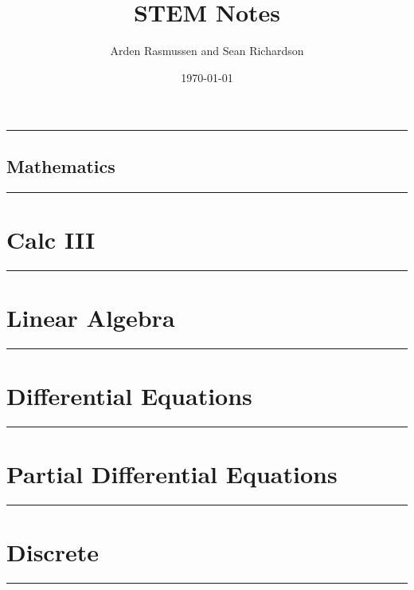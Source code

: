 \documentclass[10pt,titlepage]{asmath}
\title{STEM Notes}
\author{Arden Rasmussen and Sean Richardson}
\date{\today}
\newcommand{\hdiv}[3]{
  \vspace{#1}%
  \noindent\rule{\textwidth}{#2}%
  \vspace{#3}%
}
\theoremstyle{definition}
\begin{document}
\maketitle
\tableofcontents
\newpage
{}

\vspace*{\fill}
\hdiv{10pt}{3pt}{15pt}
\chapter{Mathematics}%
\label{cha:mathematics}
\hdiv{15pt}{3pt}{10pt}
\vspace*{\fill}
\newpage


\part{Calc III}%
\label{prt:calc_iii}
\hdiv{10pt}{2pt}{10pt}
\begin{multicols}{2}
  
\end{multicols}

\newpage
\part{Linear Algebra}%
\label{prt:linear_algebra}
\hdiv{10pt}{2pt}{10pt}
\begin{multicols}{2}
  
\end{multicols}

\newpage
\part{Differential Equations}%
\label{prt:differential_equations}
\hdiv{10pt}{2pt}{10pt}
\begin{multicols}{2}
  
\end{multicols}

\newpage
\part{Partial Differential Equations}%
\label{prt:partial_differential_equations}
\hdiv{10pt}{2pt}{10pt}
\begin{multicols}{2}
  
\end{multicols}

\newpage
\part{Discrete}%
\label{prt:discrete}
\hdiv{10pt}{2pt}{10pt}
\begin{multicols}{2}
  
\end{multicols}
\end{document}
